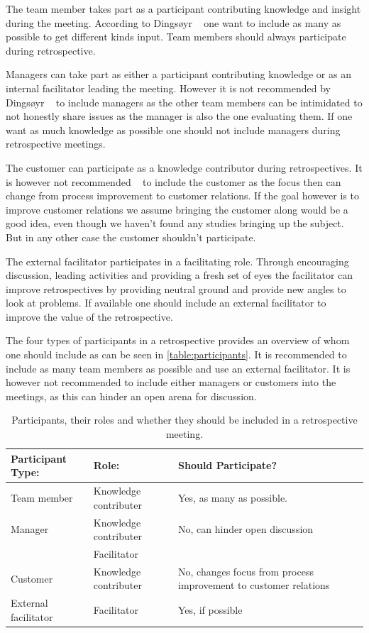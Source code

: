 \documentclass[12pt]{article}
\begin{document}
The team member takes part as a participant contributing knowledge and insight during the meeting. According to Dingsøyr ~\cite{Dingsoyr2005} one want to include as many as possible to get different kinds input. Team members should always participate during retrospective.

Managers can take part as either a participant contributing knowledge or as an internal facilitator leading the meeting. However it is not recommended by Dingsøyr ~\cite{Dingsoyr2005} to include managers as the other team members can be intimidated to not honestly share issues as the manager is also the one evaluating them. If one want as much knowledge as possible one should not include managers during retrospective meetings.

The customer can participate as a knowledge contributor during retrospectives. It is however not recommended ~\cite{Dingsoyr2005} to include the customer as the focus then can change from process improvement to customer relations. If the goal however is to improve customer relations we assume bringing the customer along would be a good idea, even though we haven't found any studies bringing up the subject. But in any other case the customer shouldn't participate.

The external facilitator participates in a facilitating role. Through encouraging discussion, leading activities and providing a fresh set of eyes the facilitator can improve retrospectives by providing neutral ground and provide new angles to look at problems. If available one should include an external facilitator to improve the value of the retrospective.

The four types of participants in a retrospective provides an overview of whom one should include as can be seen in \autoref{table:participants}. It is recommended to include as many team members as possible and use an external facilitator. It is however not recommended to include either managers or customers into the meetings, as this can hinder an open arena for discussion. 

\begin{table}[!h]
	\centering
	\captionsetup{justification=centering}
	\caption{Participants, their roles and whether they should be included in a retrospective meeting.}
	\label{table:participants}
	\begin{tabular}{| l | l | p{} |}
		\hline
		Participant Type: & Role: & Should Participate?\\ \hline
		Team member & Knowledge contributer & Yes, as many as possible. \\ \hline
		Manager & Knowledge contributer & No, can hinder open discussion \\
		& Facilitator & \\ \hline
		Customer & Knowledge contributer & No, changes focus from process improvement to customer relations \\ \hline
		External facilitator & Facilitator & Yes, if possible \\ 
		\hline
	\end{tabular}
\end{table}
\end{document}
